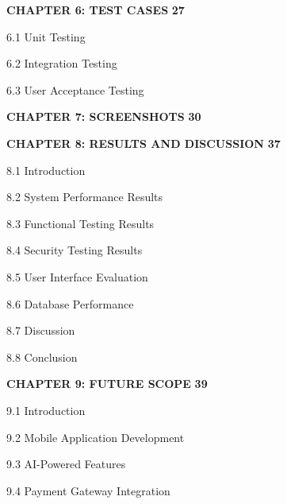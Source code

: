 \documentclass[12pt,a4paper]{report}
\begin{document}
\noindent \textbf{CHAPTER 6: TEST CASES} \dotfill \textbf{27}

\hspace{1.5em} 6.1 Unit Testing 

\hspace{1.5em} 6.2 Integration Testing 

\hspace{1.5em} 6.3 User Acceptance Testing 

\vspace{8pt}

\noindent \textbf{CHAPTER 7: SCREENSHOTS} \dotfill \textbf{30}

\vspace{8pt}

\noindent \textbf{CHAPTER 8: RESULTS AND DISCUSSION} \dotfill \textbf{37}

\hspace{1.5em} 8.1 Introduction 

\hspace{1.5em} 8.2 System Performance Results 

\hspace{1.5em} 8.3 Functional Testing Results 

\hspace{1.5em} 8.4 Security Testing Results 

\hspace{1.5em} 8.5 User Interface Evaluation 

\hspace{1.5em} 8.6 Database Performance 

\hspace{1.5em} 8.7 Discussion 

\hspace{1.5em} 8.8 Conclusion 

\vspace{8pt}

\noindent \textbf{CHAPTER 9: FUTURE SCOPE} \dotfill \textbf{39}

\hspace{1.5em} 9.1 Introduction 

\hspace{1.5em} 9.2 Mobile Application Development 

\hspace{1.5em} 9.3 AI-Powered Features 

\hspace{1.5em} 9.4 Payment Gateway Integration 
\end{document}
